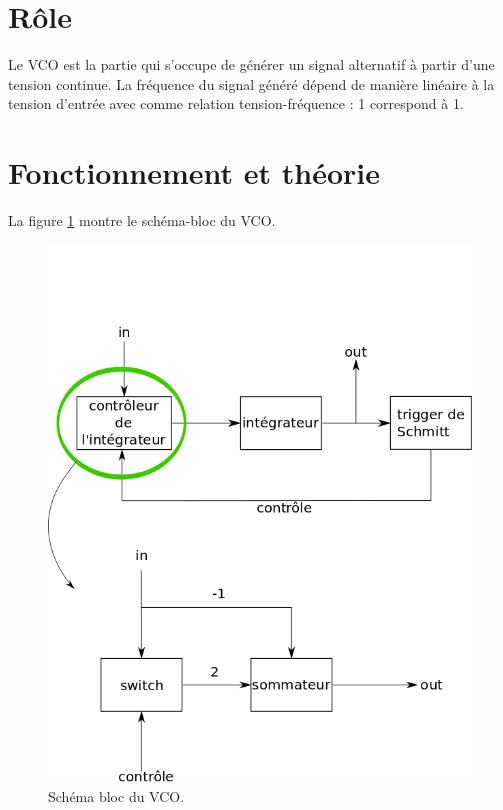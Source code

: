 
\section{Rôle}
Le VCO est la partie qui s'occupe de générer un signal alternatif à partir d'une tension continue. La fréquence du signal généré dépend de manière linéaire à la tension d'entrée avec comme relation tension-fréquence : \unit{1}{\milli\volt} correspond à \unit{1}{\hertz}.
\section{Fonctionnement et théorie}
La figure \ref{fig:schema_bloc_vco} montre le schéma-bloc du VCO.

\begin{figure}[ht]
	\centering
	\includegraphics[scale=0.3]{img-vco/schema_bloc_vco.png}
	\caption{Schéma bloc du VCO.}
	\label{fig:schema_bloc_vco}
\end{figure}

